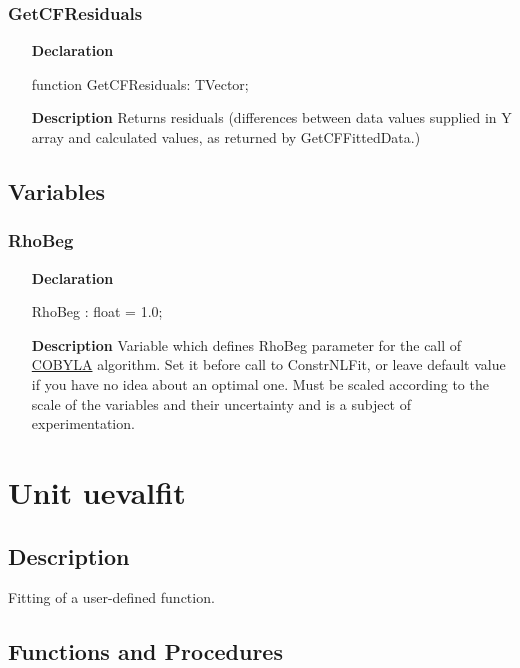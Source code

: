 \documentclass[12pt,a4paper,oneside]{report}
\newcommand{\declarationitem}[1]{\textbf{#1}}
\newcommand{\descriptiontitle}[1]{\textbf{#1}}
\begin{document}
\subsubsection{GetCFResiduals}
\label{uconstrnlfit:GetCFResiduals}
\begin{itemize}
	\item[\declarationitem{Declaration}\hfill]
	\begin{flushleft}
	function GetCFResiduals: TVector;
	\end{flushleft}
	\item[\descriptiontitle{Description}\hfill]
	Returns residuals (differences between data values supplied in Y array and calculated values, as returned by GetCFFittedData.)
\end{itemize}
\subsection{Variables}
\subsubsection{RhoBeg}
\label{uconstrnlfit:RhoBeg}
\begin{itemize}
	\item[\declarationitem{Declaration}\hfill]
	\begin{flushleft}
  RhoBeg : float = 1.0;
	\end{flushleft}
	\item[\descriptiontitle{Description}\hfill]
	Variable which defines RhoBeg parameter for the call of \hyperref[cobyla]{COBYLA} algorithm. Set it before call to ConstrNLFit, or leave default value if you have no idea about an optimal one. Must be scaled according to the scale of the variables and their uncertainty and is a subject of experimentation.
\end{itemize}
	
\section{Unit uevalfit}
\label{uevalfit}
\subsection{Description}
Fitting of a user{-}defined function. 
\subsection{Functions and Procedures}
\end{document}
